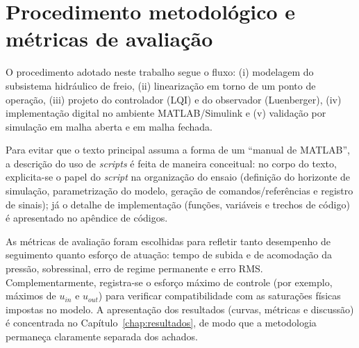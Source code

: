 

\section{Procedimento metodológico e métricas de avaliação}
\label{sec:metodologia-procedimento}

O procedimento adotado neste trabalho segue o fluxo: (i) modelagem do subsistema hidráulico de freio, (ii) linearização em torno de um ponto de operação, (iii) projeto do controlador (LQI) e do observador (Luenberger), (iv) implementação digital no ambiente MATLAB/Simulink e (v) validação por simulação em malha aberta e em malha fechada.

Para evitar que o texto principal assuma a forma de um “manual de MATLAB”, a descrição do uso de \textit{scripts} é feita de maneira conceitual: no corpo do texto, explicita-se o papel do \textit{script} na organização do ensaio (definição do horizonte de simulação, parametrização do modelo, geração de comandos/referências e registro de sinais); já o detalhe de implementação (funções, variáveis e trechos de código) é apresentado no apêndice de códigos.

As métricas de avaliação foram escolhidas para refletir tanto desempenho de seguimento quanto esforço de atuação: tempo de subida e de acomodação da pressão, sobressinal, erro de regime permanente e erro RMS. Complementarmente, registra-se o esforço máximo de controle (por exemplo, máximos de $u_{in}$ e $u_{out}$) para verificar compatibilidade com as saturações físicas impostas no modelo. A apresentação dos resultados (curvas, métricas e discussão) é concentrada no Capítulo~\ref{chap:resultados}, de modo que a metodologia permaneça claramente separada dos achados.